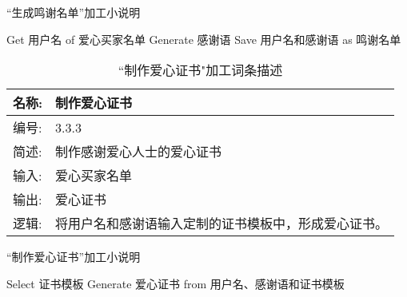 \begin{algorithm}[H]
    \renewcommand{\thealgorithm}{}
    \caption{“生成鸣谢名单”加工小说明} 
    \label{alg3} 
    \begin{algorithmic}[1] 
        \STATE Get 用户名 of 爱心买家名单
        \STATE Generate 感谢语
        \STATE Save 用户名和感谢语 as 鸣谢名单
    \end{algorithmic} 
\end{algorithm}
    
    \begin{table}[H]  
    \caption{``制作爱心证书"加工词条描述}  
    \begin{center}  
        \begin{tabular}{l p{11cm}} 
            \hline
            \quad 名称:  &   制作爱心证书 \\
            \hline
            \quad 编号:  & 3.3.3 \\
            \hline
            \quad 简述:  & 制作感谢爱心人士的爱心证书 \\
            \hline
            \quad 输入:  & 爱心买家名单 \\
            \hline
            \quad 输出:  & 爱心证书 \\
            \hline
            \quad 逻辑:  & 将用户名和感谢语输入定制的证书模板中，形成爱心证书。 \\
            \hline
        \end{tabular}
        \label{tab1}
    \end{center}
    \end{table}

\begin{algorithm}[H]
    \renewcommand{\thealgorithm}{}
    \caption{“制作爱心证书”加工小说明} 
    \label{alg3} 
    \begin{algorithmic}[1] 
        \STATE Select 证书模板
        \STATE Generate 爱心证书 from 用户名、感谢语和证书模板
    \end{algorithmic} 
\end{algorithm}